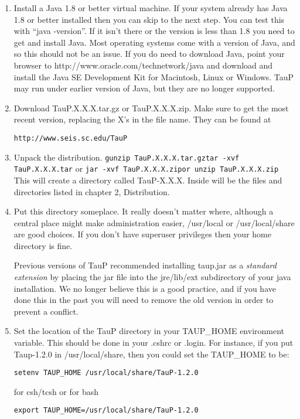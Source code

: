 \begin{enumerate}
\item Install a Java 1.8 or better virtual machine. If your system already has Java 1.8
or better installed then you can skip to the next step. You can test this
with ``java -version''. If it isn't there or the version is less than 1.8
you need to get and install Java. Most operating systems come with a version
of Java, and so this should not be an issue. If you do need to download Java,
point
your browser to http://www.oracle.com/technetwork/java and download and install
the Java SE Development Kit for Macintosh, Linux or Windows. TauP may run under earlier version of Java, but they are no longer supported.

\item Download TauP.X.X.X.tar.gz or TauP.X.X.X.zip. Make sure to get the most recent version, replacing the X's  in the file name. They can be found at

\texttt{http://www.seis.sc.edu/TauP}

\item Unpack the distribution.
\texttt{\newline gunzip TauP.X.X.X.tar.gz\newline tar -xvf TauP.X.X.X.tar\newline}
or
\texttt{\newline jar -xvf TauP.X.X.X.zip\newline or unzip TauP.X.X.X.zip}
This will create a directory called TauP-X.X.X. Inside
will be the files and directories listed in chapter 2, Distribution.

\item Put this directory someplace. It really doesn't matter where, although
a central place might make administration easier, /usr/local or
/usr/local/share are good choices. If you don't have superuser privileges
then your home directory is fine.

Previous versions of TauP recommended installing taup.jar as a \textit{standard extension} by placing the jar file into the jre/lib/ext subdirectory of your java installation. We no longer believe this is a good
practice, and if you have done this in the past you will need to remove the old version in order to
prevent a conflict.

\item Set the location of the TauP directory in your TAUP\_HOME environment variable.
This should be done in your .cshrc or .login. For instance, if you put Taup-1.2.0 in
/usr/local/share, then you could set the TAUP\_HOME to be:
\begin{verbatim}
setenv TAUP_HOME /usr/local/share/TauP-1.2.0
\end{verbatim}
for csh/tcsh or for bash
\begin{verbatim}
export TAUP_HOME=/usr/local/share/TauP-1.2.0
\end{verbatim}


\end{enumerate}
